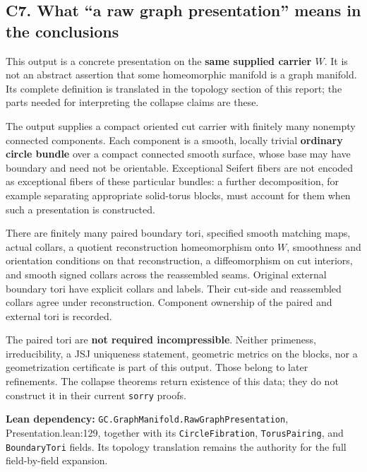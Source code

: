 \documentclass[
  letterpaper,
  11pt]{article}
\begin{document}
\subsection{C7. What ``a raw graph presentation'' means in the
conclusions}\label{collapse-output}

This output is a concrete presentation on the \textbf{same supplied
carrier \(W\)}. It is not an abstract assertion that some homeomorphic
manifold is a graph manifold. Its complete definition is translated in
the topology section of this report; the parts needed for interpreting
the collapse claims are these.

The output supplies a compact oriented cut carrier with finitely many
nonempty connected components. Each component is a smooth, locally
trivial \textbf{ordinary circle bundle} over a compact connected smooth
surface, whose base may have boundary and need not be orientable.
Exceptional Seifert fibers are not encoded as exceptional fibers of
these particular bundles: a further decomposition, for example
separating appropriate solid-torus blocks, must account for them when
such a presentation is constructed.

There are finitely many paired boundary tori, specified smooth matching
maps, actual collars, a quotient reconstruction homeomorphism onto
\(W\), smoothness and orientation conditions on that reconstruction, a
diffeomorphism on cut interiors, and smooth signed collars across the
reassembled seams. Original external boundary tori have explicit collars
and labels. Their cut-side and reassembled collars agree under
reconstruction. Component ownership of the paired and external tori is
recorded.

The paired tori are \textbf{not required incompressible}. Neither
primeness, irreducibility, a JSJ uniqueness statement, geometric metrics
on the blocks, nor a geometrization certificate is part of this output.
Those belong to later refinements. The collapse theorems return
existence of this data; they do not construct it in their current
{\small\texttt{sorry}} proofs.

\textbf{Lean dependency:}
{\small\texttt{GC.\allowbreak{}Graph\allowbreak{}Manifold.\allowbreak{}Raw\allowbreak{}Graph\allowbreak{}Presentation}},
Presentation.lean:129, together with its
{\small\texttt{Circle\allowbreak{}Fibration}},
{\small\texttt{Torus\allowbreak{}Pairing}}, and
{\small\texttt{Boundary\allowbreak{}Tori}} fields. Its topology
translation remains the authority for the full field-by-field expansion.
\end{document}
